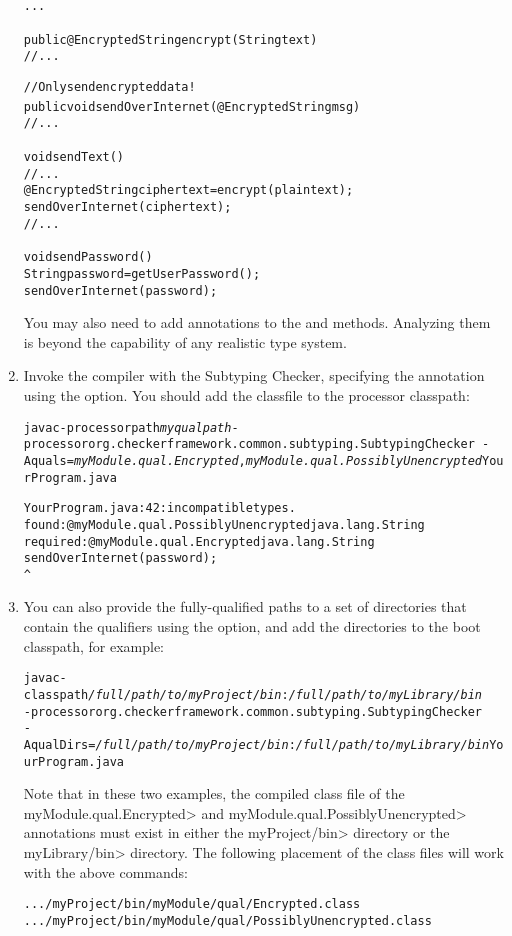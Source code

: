 \begin{enumerate}
\begin{alltt}
...

public @Encrypted String encrypt(String text) {
    // ...
}

// Only send encrypted data!
public void sendOverInternet(@Encrypted String msg) {
    // ...
}

void sendText() {
    // ...
    @Encrypted String ciphertext = encrypt(plaintext);
    sendOverInternet(ciphertext);
    // ...
}

void sendPassword() {
    String password = getUserPassword();
    sendOverInternet(password);
}
\end{alltt}

You may also need to add  annotations to the
 and  methods.  Analyzing them is beyond the
capability of any realistic type system.

\item
  Invoke the compiler with the Subtyping Checker, specifying the
   annotation using the  option.
  You should add the  classfile to the processor classpath:

\begin{alltt}
  javac -processorpath \textit{myqualpath} -processor org.checkerframework.common.subtyping.SubtypingChecker \
        -Aquals=\textit{myModule.qual.Encrypted},\textit{myModule.qual.PossiblyUnencrypted} YourProgram.java

YourProgram.java:42: incompatible types.
found   : @myModule.qual.PossiblyUnencrypted java.lang.String
required: @myModule.qual.Encrypted java.lang.String
    sendOverInternet(password);
                     ^
\end{alltt}

\item
You can also provide the fully-qualified paths to a set of directories
that contain the qualifiers using the \code{-AqualDirs} option, and add
the directories to the boot classpath, for example:

\begin{alltt}
  javac -classpath \textit{/full/path/to/myProject/bin}:\textit{/full/path/to/myLibrary/bin} \ttbs
        -processor org.checkerframework.common.subtyping.SubtypingChecker \ttbs
        -AqualDirs=\textit{/full/path/to/myProject/bin}:\textit{/full/path/to/myLibrary/bin} YourProgram.java
\end{alltt}

\begin{sloppypar}
Note that in these two examples, the compiled class file of the
\<myModule.qual.Encrypted> and \<myModule.qual.PossiblyUnencrypted> annotations
must exist in either the \<myProject/bin> directory or the \<myLibrary/bin>
directory. The following placement of the class files will work with the above
commands:
\end{sloppypar}

\begin{alltt}
  .../myProject/bin/myModule/qual/Encrypted.class
  .../myProject/bin/myModule/qual/PossiblyUnencrypted.class
\end{alltt}

\end{enumerate}

